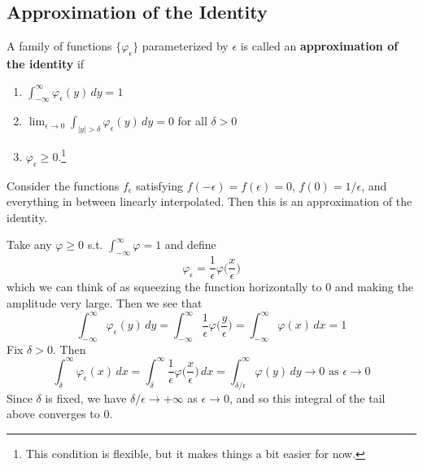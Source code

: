\subsection{Approximation of the Identity} 

  \begin{definition}
    A family of functions $\{\varphi_\epsilon\}$ parameterized by $\epsilon$ is called an \textbf{approximation of the identity} if 
    \begin{enumerate}
      \item $\int_{-\infty}^{\infty} \varphi_\epsilon (y) \,dy = 1$ 
      \item $\lim_{\epsilon \to 0} \int_{|y| > \delta} \varphi_\epsilon (y) \,dy = 0$ for all $\delta > 0$ 
      \item $\varphi_\epsilon \geq 0$.\footnote{This condition is flexible, but it makes things a bit easier for now.}
    \end{enumerate}
  \end{definition}

  \begin{example}
    Consider the functions $f_\epsilon$ satisfying $f(-\epsilon) = f(\epsilon) = 0$, $f(0) = 1/\epsilon$, and everything in between linearly interpolated. Then this is an approximation of the identity. 
  \end{example}

  \begin{example}
    Take any $\varphi \geq 0$ s.t. $\int_{-\infty}^\infty \varphi = 1$ and define 
    \begin{equation}
      \varphi_\epsilon = \frac{1}{\epsilon} \varphi \bigg( \frac{x}{\epsilon} \bigg)
    \end{equation}
    which we can think of as squeezing the function horizontally to $0$ and making the amplitude very large. Then we see that 
    \begin{equation}
      \int_{-\infty}^{\infty} \varphi_\epsilon (y) \,dy = \int_{-\infty}^{\infty} \frac{1}{\epsilon} \varphi \bigg(\frac{y}{\epsilon} \bigg) = \int_{-\infty}^\infty \varphi(x) \,dx = 1
    \end{equation}
    Fix $\delta > 0$. Then 
    \begin{equation}
      \int_\delta^{\infty} \varphi_\epsilon (x) \,dx = \int_\delta^\infty \frac{1}{\epsilon} \varphi \bigg( \frac{x}{\epsilon} \bigg) \,dx = \int_{\delta/\epsilon}^\infty \varphi(y) \,dy \to 0 \text{ as } \epsilon \to 0
    \end{equation}
    Since $\delta$ is fixed, we have $\delta/\epsilon \to +\infty$ as $\epsilon \to 0$, and so this integral of the tail above converges to $0$.  
  \end{example} 

